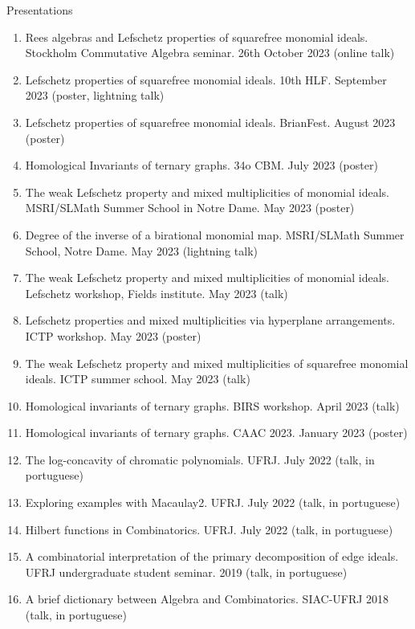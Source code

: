 \documentclass{resume} %
\begin{document}
\begin{rSection}{Presentations}
    \begin{enumerate}[label={}]
        \item Rees algebras and Lefschetz properties of squarefree monomial ideals. Stockholm Commutative Algebra seminar. 26th October 2023 (online talk)
        \item Lefschetz properties of squarefree monomial ideals. 10th HLF. September 2023 (poster, lightning talk)
        \item Lefschetz properties of squarefree monomial ideals. BrianFest. August 2023 (poster)
        \item Homological Invariants of ternary graphs. 34o CBM. July 2023 (poster)
        \item The weak Lefschetz property and mixed multiplicities of monomial ideals. MSRI/SLMath Summer School in Notre Dame. May 2023 (poster)
        \item Degree of the inverse of a birational monomial map. MSRI/SLMath Summer School, Notre Dame. May 2023 (lightning talk)
        \item The weak Lefschetz property and mixed multiplicities of monomial ideals. Lefschetz workshop, Fields institute. May 2023 (talk)
        \item Lefschetz properties and mixed multiplicities via hyperplane arrangements. ICTP workshop. May 2023 (poster)
        \item The weak Lefschetz property and mixed multiplicities of squarefree monomial ideals. ICTP summer school. May 2023 (talk)
        \item Homological invariants of ternary graphs. BIRS workshop. April 2023 (talk)
        \item Homological invariants of ternary graphs. CAAC 2023. January 2023 (poster)
        \item The log-concavity of chromatic polynomials. UFRJ. July 2022 (talk, in portuguese)
        \item Exploring examples with Macaulay2. UFRJ. July 2022 (talk, in portuguese)
        \item Hilbert functions in Combinatorics. UFRJ. July 2022 (talk, in portuguese)
        \item A combinatorial interpretation of the primary decomposition of edge ideals. UFRJ undergraduate student seminar. 2019 (talk, in portuguese)
        \item A brief dictionary between Algebra and Combinatorics. SIAC-UFRJ 2018 (talk, in portuguese)
    \end{enumerate}
\end{rSection}
\end{document}
